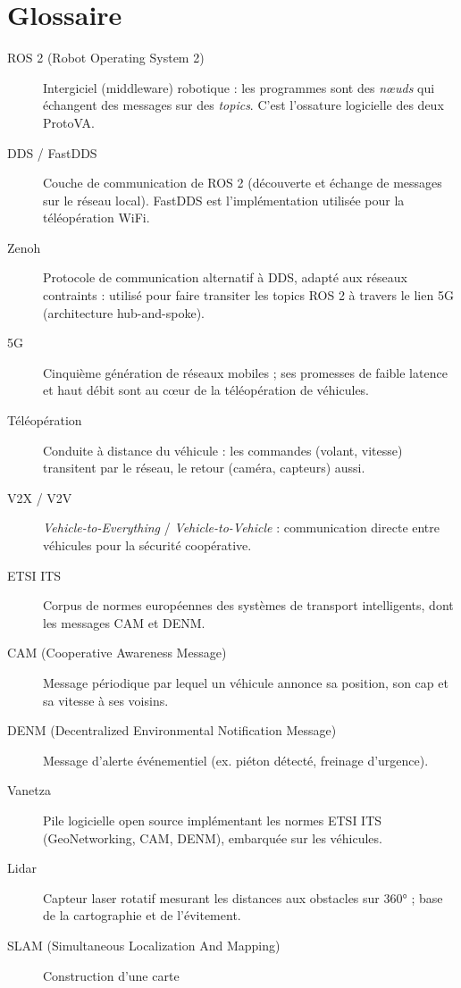 \chapter*{Glossaire}

\begin{description}
  \item[ROS 2 (Robot Operating System 2)] Intergiciel (middleware) robotique :
  les programmes sont des \emph{nœuds} qui échangent des messages sur des
  \emph{topics}. C'est l'ossature logicielle des deux ProtoVA.
  \item[DDS / FastDDS] Couche de communication de ROS 2 (découverte et échange
  de messages sur le réseau local). FastDDS est l'implémentation utilisée pour
  la téléopération WiFi.
  \item[Zenoh] Protocole de communication alternatif à DDS, adapté aux réseaux
  contraints : utilisé pour faire transiter les topics ROS 2 à travers le lien
  5G (architecture hub-and-spoke).
  \item[5G] Cinquième génération de réseaux mobiles ; ses promesses de faible
  latence et haut débit sont au c\oe ur de la téléopération de véhicules.
  \item[Téléopération] Conduite à distance du véhicule : les commandes (volant,
  vitesse) transitent par le réseau, le retour (caméra, capteurs) aussi.
  \item[V2X / V2V] \emph{Vehicle-to-Everything} / \emph{Vehicle-to-Vehicle} :
  communication directe entre véhicules pour la sécurité coopérative.
  \item[ETSI ITS] Corpus de normes européennes des systèmes de transport
  intelligents, dont les messages CAM et DENM.
  \item[CAM (Cooperative Awareness Message)] Message périodique par lequel un
  véhicule annonce sa position, son cap et sa vitesse à ses voisins.
  \item[DENM (Decentralized Environmental Notification Message)] Message
  d'alerte événementiel (ex. piéton détecté, freinage d'urgence).
  \item[Vanetza] Pile logicielle open source implémentant les normes ETSI ITS
  (GeoNetworking, CAM, DENM), embarquée sur les véhicules.
  \item[Lidar] Capteur laser rotatif mesurant les distances aux obstacles sur
  360° ; base de la cartographie et de l'évitement.
  \item[SLAM (Simultaneous Localization And Mapping)] Construction d'une carte

\end{description}
